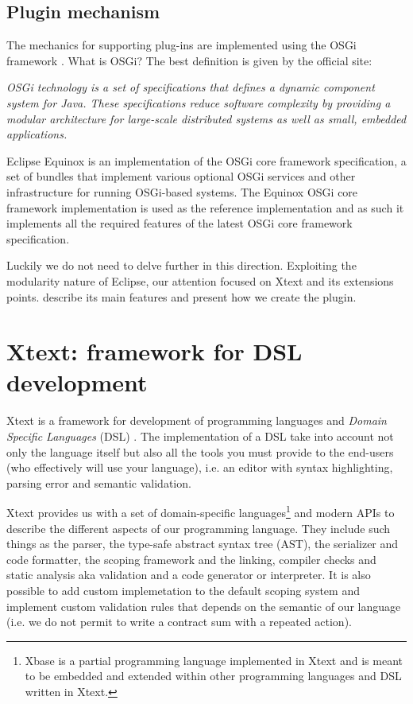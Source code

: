 \subsection{Plugin mechanism}
The mechanics for supporting plug-ins are implemented using the OSGi framework \cite{osgi-site}. What is OSGi? The best definition is given by the official site:

\begin{displayquote}
\emph{OSGi technology is a set of specifications that defines a dynamic component system for Java. These specifications reduce software complexity by providing a modular architecture for large-scale distributed systems as well as small, embedded applications.} 
\end{displayquote}

Eclipse Equinox \cite{equinox-site} is an implementation of the OSGi core framework specification, a set of bundles that implement various optional OSGi services and other infrastructure for running OSGi-based systems. The Equinox OSGi core framework implementation is used as the reference implementation and as such it implements all the required features of the latest OSGi core framework specification.

Luckily we do not need to delve further in this direction. Exploiting the modularity nature of Eclipse, our attention focused on Xtext and its extensions points.  describe its main features and  present how we create the \coco plugin.

\section{Xtext: framework for DSL development}\label{sec:xtext}
Xtext is a framework for development of programming languages and \textit{Domain Specific Languages} (DSL) \cite{xtext-site}. The implementation of a DSL take into account not only the language itself but also all the tools you must provide to the end-users (who effectively will use your language), i.e. an editor with syntax highlighting, parsing error and semantic validation.

Xtext provides us with a set of domain-specific languages\footnote{Xbase is a partial programming language implemented in Xtext and is meant to be embedded and extended within other programming languages and DSL written in Xtext.} and modern APIs to describe the different aspects of our programming language. They include such things as the parser, the type-safe abstract syntax tree (AST), the serializer and code formatter, the scoping framework and the linking, compiler checks and static analysis aka validation and a code generator or interpreter. It is also possible to add custom implemetation to the default scoping system and implement custom validation rules that depends on the semantic of our \coco language (i.e. we do not permit to write a contract sum with a repeated action).


